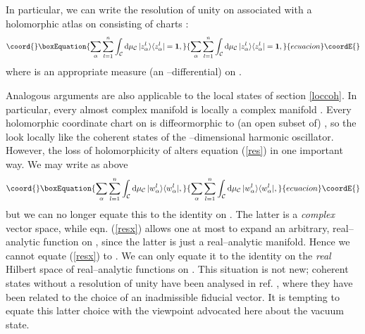 \documentclass[a4paper,a4paper]{article}
\begin{document}
In particular, we can write the resolution of unity on \coordHE{} 
associated with a holomorphic atlas on \coordHE{} consisting of charts
\coordHE{}:
\begin{equation}\coord{}\boxEquation{
\sum_{\alpha}\sum_{l=1}^n\int_{\cal C} {\rm d}\mu_{\cal C}\, |z^l_{\alpha}\rangle  \langle 
z^l_{\alpha}|= {\bf 1},
\label{res}
}{
\sum_{\alpha}\sum_{l=1}^n\int_{\cal C} {\rm d}\mu_{\cal C}\, |z^l_{\alpha}\rangle  \langle 
z^l_{\alpha}|= {\bf 1},
}{ecuacion}\coordE{}\end{equation}
where \coordHE{} is an appropriate measure (an 
\coordHE{}--differential) on \coordHE{}. 

Analogous arguments are also applicable to the local states \coordHE{} 
of section \ref{loccoh}. 
In particular, every almost complex manifold is locally a complex manifold \cite{KN}.
Every holomorphic coordinate chart on \coordHE{} is  diffeormorphic to (an open 
subset of) \coordHE{}, so the \coordHE{} look locally like the coherent 
states of the \coordHE{}--dimensional harmonic oscillator.
However, the loss of holomorphicity of \coordHE{} 
alters equation (\ref{res}) in one important way. We may write as above
\begin{equation}\coord{}\boxEquation{
\sum_{\alpha}\sum_{l=1}^n\int_{\cal C} {\rm d}\mu_{\cal C}\, |w^l_{\alpha}\rangle  \langle 
w^l_{\alpha}|,
\label{resx}
}{
\sum_{\alpha}\sum_{l=1}^n\int_{\cal C} {\rm d}\mu_{\cal C}\, |w^l_{\alpha}\rangle  \langle 
w^l_{\alpha}|,
}{ecuacion}\coordE{}\end{equation}
but we can no longer equate this to the identity on 
\coordHE{}. The latter is a {\it complex}\/ vector space, while eqn.
(\ref{resx}) allows one at most to expand an arbitrary,
real--analytic function on \coordHE{}, since the latter is just a 
real--analytic manifold. Hence we cannot equate (\ref{resx})
to \coordHE{}. We can only equate it to the identity on the {\it 
real}\/
Hilbert space of real--analytic functions on \coordHE{}.
This situation is not new; coherent states without a resolution of unity have been 
analysed in ref. \cite{NOUNITY}, where they have been related to the choice of 
an inadmissible fiducial vector. It is tempting to equate this latter 
choice with the viewpoint advocated here about the vacuum state. 
\end{document}
